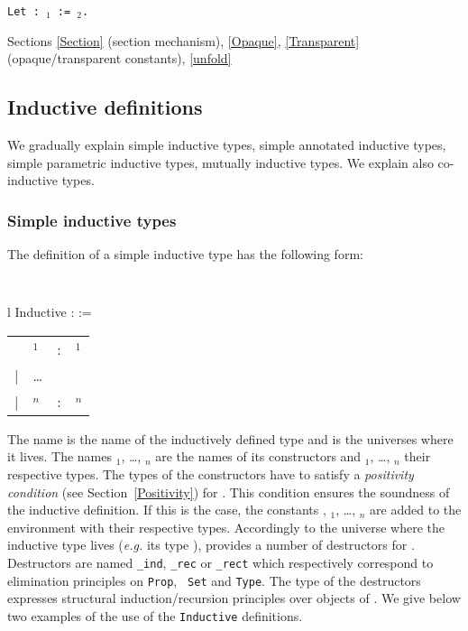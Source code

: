 \begin{Variants}
\item {\tt Let {\ident} : {\term$_1$} := {\term$_2$}.}
\end{Variants}

\SeeAlso Sections \ref{Section} (section mechanism), \ref{Opaque},
\ref{Transparent} (opaque/transparent constants), \ref{unfold}

\subsection{Inductive definitions
\label{gal_Inductive_Definitions}
\label{Inductive}}

We gradually explain simple inductive types, simple
annotated inductive types, simple parametric inductive types, 
mutually inductive types. We explain also co-inductive types.

\subsubsection{Simple inductive types}

The definition of a simple inductive type has the following form:

\medskip
{\tt 
\begin{tabular}{l}
Inductive {\ident} : {\sort} :=  \\
\begin{tabular}{clcl}
   & {\ident$_1$}  &:& {\type$_1$} \\
 | & {\ldots} && \\
 | & {\ident$_n$} &:& {\type$_n$}
\end{tabular}
\end{tabular}
}
\medskip

The name {\ident} is the name of the inductively defined type and
{\sort} is the universes where it lives.
The names {\ident$_1$}, {\ldots}, {\ident$_n$}
are the names of its constructors and {\type$_1$}, {\ldots},
{\type$_n$} their respective types. The types of the constructors have
to satisfy a {\em positivity condition} (see Section~\ref{Positivity})
for {\ident}.  This condition ensures the soundness of the inductive
definition.  If this is the case, the constants {\ident},
{\ident$_1$}, {\ldots}, {\ident$_n$} are added to the environment with
their respective types.  Accordingly to the universe where
the inductive type lives ({\it e.g.} its type {\sort}), {\Coq} provides a
number of destructors for {\ident}.  Destructors are named
{\ident}{\tt\_ind}, {\ident}{\tt \_rec} or {\ident}{\tt \_rect} which
respectively correspond to elimination principles on {\tt Prop}, {\tt
Set} and {\tt Type}.  The type of the destructors expresses structural
induction/recursion principles over objects of {\ident}. We give below
two examples of the use of the {\tt Inductive} definitions.

